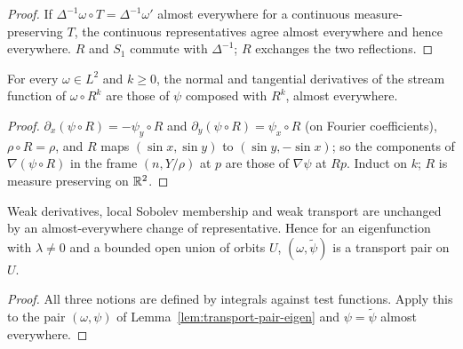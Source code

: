 \begin{proof}
\leanok
If $\Delta^{-1}\omega\circ T=\Delta^{-1}\omega'$ almost everywhere for a continuous
measure-preserving $T$, the continuous representatives agree almost everywhere and hence
everywhere. $R$ and $S_1$ commute with $\Delta^{-1}$; $R$ exchanges the two reflections.
\end{proof}

\begin{lemma}
\label{lem:normal-tangent-rotation}
\leanok
For every $\omega\in L^2$ and $k\ge0$, the normal and tangential derivatives of the stream
function of $\omega\circ R^k$ are those of $\psi$ composed with $R^k$, almost everywhere.
\end{lemma}

\begin{proof}
\leanok
$\partial_x(\psi\circ R)=-\psi_y\circ R$ and $\partial_y(\psi\circ R)=\psi_x\circ R$ (on Fourier
coefficients), $\rho\circ R=\rho$, and $R$ maps $(\sin x,\sin y)$ to $(\sin y,-\sin x)$; so the
components of $\nabla(\psi\circ R)$ in the frame $(n,Y/\rho)$ at $p$ are those of $\nabla\psi$ at
$Rp$. Induct on $k$; $R$ is measure preserving on $\mathbb{R}^2$.
\end{proof}

\begin{lemma}
\label{lem:transport-pair-continuous}
\leanok
Weak derivatives, local Sobolev membership and weak transport are unchanged by an
almost-everywhere change of representative. Hence for an eigenfunction with $\lambda\ne0$
and a bounded open union of orbits $U$, $(\omega,\tilde\psi)$ is a transport pair on $U$.
\end{lemma}

\begin{proof}
\leanok
All three notions are defined by integrals against test functions. Apply this to the pair
$(\omega,\psi)$ of Lemma~\ref{lem:transport-pair-eigen} and $\psi=\tilde\psi$ almost
everywhere.
\end{proof}

